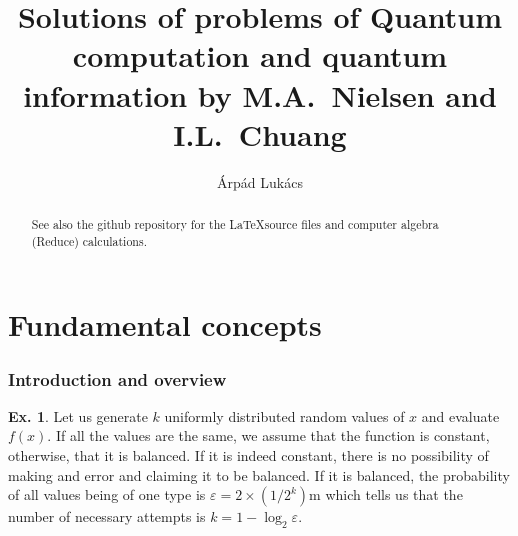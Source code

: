 \documentclass[a4paper,12pt]{article}
\title{Solutions of problems of Quantum computation and quantum information by M.A.~Nielsen and I.L.~Chuang}
\author{Árpád Lukács}
\theoremstyle{definition}
\newtheorem{exercise}{Ex.}[section]
\begin{document}
\maketitle

\begin{abstract}
 See also the github repository for the \LaTeX source files and computer algebra (Reduce) calculations.
\end{abstract}


\part{Fundamental concepts}\label{sec:fundamentalConcepts}

\section{Introduction and overview}\label{sec:introductionAndOverview}

\begin{exercise} Let us generate $k$ uniformly distributed random values of $x$ and evaluate $f(x)$. If all the values are the same, we assume that the function is constant, otherwise, that it is balanced. If it is indeed constant, there is no possibility of making and error and claiming it to be balanced. If it is balanced, the probability of all values being of one type is $\varepsilon = 2 \times (1/2^k)$m which tells us that the number of necessary attempts is $k = 1-\log_2 \varepsilon$.
\end{exercise}
\end{document}
